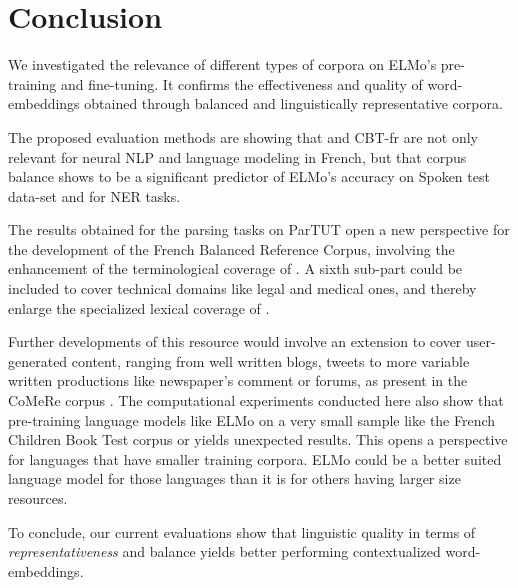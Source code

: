 \section{Conclusion} \label{sec:Concl}

We investigated the relevance of different types of corpora on ELMo's pre-training and fine-tuning. It confirms the effectiveness and quality of word-embeddings obtained through balanced and linguistically representative corpora.

The proposed evaluation methods are showing that \Cabernet and CBT-fr are not only relevant for neural NLP and language modeling in French, but that corpus balance shows to be a significant predictor of ELMo's accuracy on Spoken test data-set and for NER tasks.

The results obtained for the parsing tasks on ParTUT open a new perspective for the development of the French Balanced Reference Corpus, involving the enhancement of the terminological coverage of \Cabernet. A sixth sub-part could be included to cover technical domains like legal and medical ones, and thereby enlarge the specialized lexical coverage of \Cabernet.

Further developments of this resource would involve an extension to cover user-generated content, ranging from well written blogs, tweets to more variable written productions like newspaper's comment or forums, as present in the CoMeRe corpus \citep{chanier-etal-2014-the}. The computational experiments conducted here also show that pre-training language models like ELMo on a very small sample like the French Children Book Test corpus or \Cabernet yields unexpected results. This opens a perspective for languages that have smaller training corpora. ELMo could be a better suited language model for those languages than it is for others having larger size resources.

To conclude, our current evaluations show that linguistic quality in terms of \emph{representativeness} and balance yields better performing contextualized word-embeddings.
